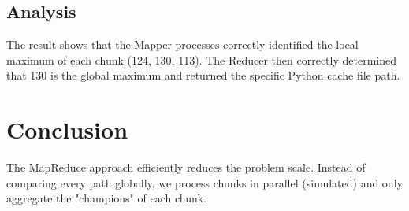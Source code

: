 \documentclass{article}
\begin{document}
\subsection{Analysis}
The result shows that the Mapper processes correctly identified the local maximum of each chunk (124, 130, 113). The Reducer then correctly determined that 130 is the global maximum and returned the specific Python cache file path.

\section{Conclusion}
The MapReduce approach efficiently reduces the problem scale. Instead of comparing every path globally, we process chunks in parallel (simulated) and only aggregate the "champions" of each chunk.
\end{document}
